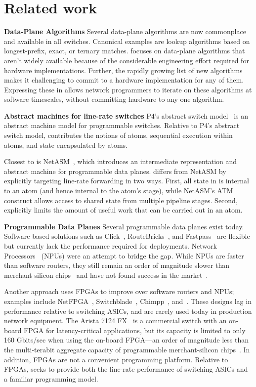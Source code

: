 \section{Related work}
\label{s:related}
\textbf{Data-Plane Algorithms}
Several data-plane algorithms are now commonplace and available in all
switches. Canonical examples are lookup algorithms based on longest-prefix,
exact, or ternary matches. \pktlanguage focuses on data-plane algorithms that
aren't widely available because of the considerable engineering effort required
for hardware implementations. Further, the rapidly growing list of new
algorithms~\cite{pdq, d3, detail, codel, conga} makes it challenging to commit
to a hardware implementation for any of them.  Expressing these in \pktlanguage
allows network programmers to iterate on these algorithms at software
timescales, without committing hardware to any one algorithm.

\textbf{Abstract machines for line-rate switches}
P4's abstract switch model~\cite{p4} is an abstract machine model for
programmable switches.  Relative to P4's abstract switch model, \absmachine
contributes the notions of atoms, sequential execution within atoms, and state
encapsulated by atoms.

Closest to \absmachine is NetASM~\cite{netasm}, which introduces an
intermediate representation and abstract machine for programmable data planes.
\absmachine differs from NetASM by explicitly targeting line-rate forwarding in
two ways.  First, all state in \absmachine is internal to an atom (and hence
internal to the atom's stage), while NetASM's ATM construct allows access to
shared state from multiple pipeline stages. Second, \absmachine explicitly
limits the amount of useful work that can be carried out in an atom.

\textbf{Programmable Data Planes}
Several programmable data planes exist today. Software-based solutions such as
Click~\cite{click}, RouteBricks~\cite{routebricks}, and
Fastpass~\cite{fastpass} are flexible but currently lack the performance
required for deployments. Network Processors~\cite{ixp2800, ixp4xx} (NPUs) were
an attempt to bridge the gap.  While NPUs are faster than software routers,
they still remain an order of magnitude slower than merchant silicon
chips~\cite{rmt} and have not found success in the market~\cite{npfail}.

Another approach uses FPGAs to improve over software routers and NPUs; examples
include NetFPGA~\cite{netfpga}, Switchblade~\cite{switchblade},
Chimpp~\cite{chimpp}, and~\cite{silver_bullet}. These designs lag in
performance relative to switching ASICs, and are rarely used today in
production network equipment. The Arista 7124 FX~\cite{7124fx} is a commercial
switch with an on-board FPGA for latency-critical applications, but its
capacity is limited to only 160 Gbits/sec when using the on-board FPGA---an
order of magnitude less than the multi-terabit aggregate capacity of
programmable merchant-silicon chips~\cite{xpliant}. In addition, FPGAs are not
a convenient programming platform. Relative to FPGAs, \pktlanguage seeks to
provide both the line-rate performance of switching ASICs and a familiar
programming model.

